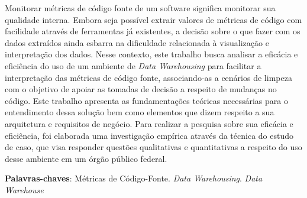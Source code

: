 \begin{resumo}

Monitorar métricas de código fonte de um software significa monitorar sua qualidade interna. Embora seja possível extrair valores de métricas de código com facilidade através de ferramentas já existentes, a decisão sobre o que fazer com os dados extraídos ainda esbarra na dificuldade relacionada à visualização e interpretação dos dados. Nesse contexto, este trabalho busca analisar a eficácia e eficiência do uso de um ambiente de \textit{Data Warehousing} para facilitar a interpretação das métricas de código fonte, associando-as a cenários de limpeza com o objetivo de apoiar as tomadas de decisão a respeito de mudanças no código. Este trabalho apresenta as fundamentações teóricas necessárias para o entendimento dessa solução bem como elementos que dizem respeito a sua arquitetura e requisitos de negócio. Para realizar a pesquisa sobre sua eficácia e eficiência, foi elaborada uma investigação empírica através da técnica do estudo de caso, que visa responder questões qualitativas e quantitativas a respeito do uso desse ambiente em um órgão público federal.

 \vspace{\onelineskip}
    
 \noindent
 \textbf{Palavras-chaves}: Métricas de Código-Fonte. \textit{Data Warehousing}. \textit{Data Warehouse}
\end{resumo}

